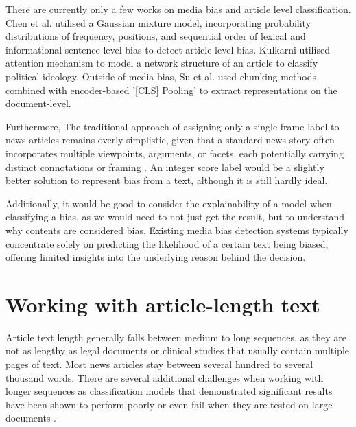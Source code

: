 There are currently only a few works on media bias and article level classification. Chen et al. \cite{chen-2020-detecting-media-bias-gaussian} utilised a Gaussian mixture model, incorporating probability distributions of frequency, positions, and sequential order of lexical and informational sentence-level bias to detect article-level bias. Kulkarni \cite{kulkarni-2018-multi-view} utilised attention mechanism to model a network structure of an article to classify political ideology. Outside of media bias, Su et al. \cite{su-2021-classifying} used chunking methods combined with encoder-based '[CLS] Pooling' to extract representations on the document-level.

\begin{comment}(I think there is a cite for different sentences opposite bias in an article, I remember reading).\end{comment}

Furthermore, The traditional approach of assigning only a single frame label to news articles remains overly simplistic, given that a standard news story often incorporates multiple viewpoints, arguments, or facets, each potentially carrying distinct connotations or framing \cite{vallejo-2023-connecting}. An integer score label would be a slightly better solution to represent bias from a text, although it is still hardly ideal.

Additionally, it would be good to consider the explainability of a model when classifying a bias, as we would need to not just get the result, but to understand why contents are considered bias. Existing media bias detection systems typically concentrate solely on predicting the likelihood of a certain text being biased, offering limited insights into the underlying reason behind the decision.

\section{Working with article-length text}

Article text length generally falls between medium to long sequences, as they are not as lengthy as legal documents or clinical studies that usually contain multiple pages of text. Most news articles stay between several hundred to several thousand words. There are several additional challenges when working with longer sequences as classification models that demonstrated significant results have been shown to perform poorly or even fail when they are tested on large documents \cite{wan-2019-long-length}.

